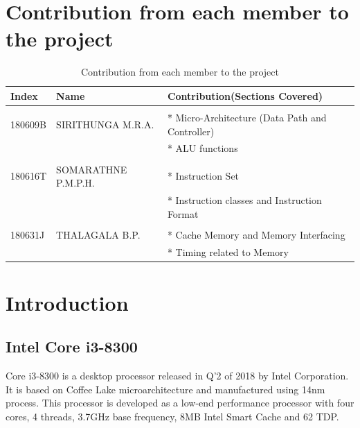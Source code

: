 \documentclass[a4paper,11pt]{article}
\begin{document}

\tableofcontents
\section*{\textbf{{Contribution from each member to the project}}}

\begin{table}[!h]
	\centering

		\begin{tabular}{|l|l|l|}
			\hline
			\textbf{Index}	&\textbf{Name} 	&\textbf{Contribution(Sections Covered)}\\ \hline
			&&\\
		180609B  	&SIRITHUNGA M.R.A. &* Micro-Architecture (Data Path and  Controller)\\
		&&* ALU functions\\ \hline&&\\

 		180616T  	&SOMARATHNE P.M.P.H. &* Instruction Set\\
 		&&*  Instruction classes and Instruction Format\\\hline&&\\

 		180631J		&THALAGALA B.P.&* Cache Memory and Memory Interfacing\\
 		&&*  Timing related to Memory\\\hline
		\end{tabular}

			\caption{Contribution from each member to the project}
\end{table}

\pagebreak
\section{Introduction}
\subsection{Intel Core i3-8300}
Core i3-8300 is a desktop processor released in Q'2 of 2018 by Intel Corporation. It is based on Coffee Lake microarchitecture and manufactured using 14nm process. This processor is developed as a low-end performance processor with four cores, 4 threads, 3.7GHz base frequency, 8MB Intel Smart Cache and 62 TDP.\cite{i3doc}
\end{document}
